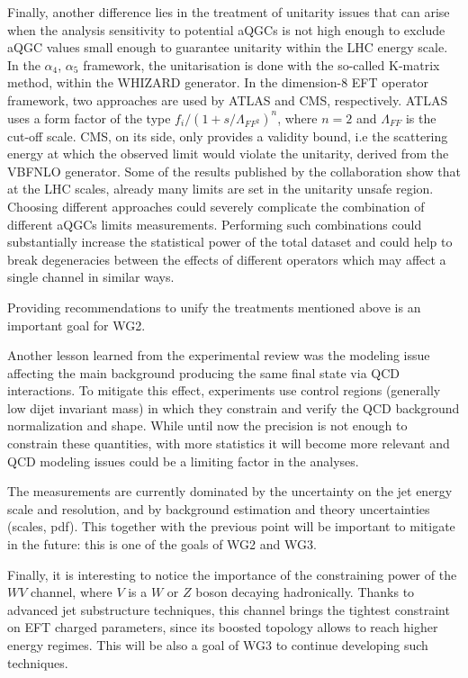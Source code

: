 Finally, another difference lies in the treatment of unitarity issues that can arise when the analysis sensitivity to potential aQGCs is not high enough to exclude aQGC values small enough to guarantee unitarity within the LHC energy scale. In the $\alpha_4$, $\alpha_5$ framework, the unitarisation is done with the so-called K-matrix method, within the WHIZARD generator. In the dimension-8 EFT operator framework, two approaches are used by ATLAS and CMS, respectively. ATLAS uses a form factor of the type $f_i/(1+s/\Lambda_{FF^2})^n$, where $n=2$ and $\Lambda_{FF}$ is the cut-off scale. CMS, on its side, only provides a validity bound, i.e the scattering energy at which the observed limit would violate the unitarity, derived from the VBFNLO generator. Some of the results published by the collaboration show that at the LHC scales, already many limits are set in the unitarity unsafe region. 
Choosing different approaches could severely complicate the combination of different aQGCs limits measurements. Performing such combinations could substantially increase the statistical power of the total dataset and could help to break degeneracies between the effects of different operators which may affect a single channel in similar ways.

Providing recommendations to unify the treatments mentioned above is an important goal for WG2. 

Another lesson learned from the experimental review was the modeling issue affecting the main background producing the same final state via QCD interactions. To mitigate this effect, experiments use control regions (generally low dijet invariant mass) in which they constrain and verify the QCD background normalization and shape. While until now the precision is not enough to constrain these quantities, with more statistics it will become more relevant and QCD modeling issues could be a limiting factor in the analyses.

The measurements are currently dominated by the uncertainty on the jet energy scale and resolution, and by background estimation and theory uncertainties (scales, pdf). This together with the previous point will be important to mitigate in the future: this is one of the goals of WG2 and WG3.
 
Finally, it is interesting to notice the importance of the constraining power of the $WV$ channel, where $V$ is a $W$ or $Z$ boson decaying hadronically. Thanks to advanced jet substructure techniques, this channel brings the tightest constraint on EFT charged parameters, since its boosted topology allows to reach higher energy regimes. This will be also a goal of WG3 to continue developing such techniques. 
